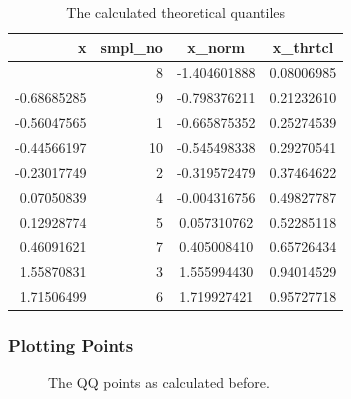 \documentclass[
  a4paper,
]{scrbook}
\begin{document}
\begin{longtable}{rrcc}

\caption{\label{tbl-qq-smpl-thrtcl}The calculated theoretical quantiles}

\tabularnewline

\toprule
x & smpl\_no & x\_norm & x\_thrtcl \\ 
\midrule\addlinespace[2.5pt]
-1.26506123 & 8 & -1.404601888 & 0.08006985 \\ 
-0.68685285 & 9 & -0.798376211 & 0.21232610 \\ 
-0.56047565 & 1 & -0.665875352 & 0.25274539 \\ 
-0.44566197 & 10 & -0.545498338 & 0.29270541 \\ 
-0.23017749 & 2 & -0.319572479 & 0.37464622 \\ 
0.07050839 & 4 & -0.004316756 & 0.49827787 \\ 
0.12928774 & 5 & 0.057310762 & 0.52285118 \\ 
0.46091621 & 7 & 0.405008410 & 0.65726434 \\ 
1.55870831 & 3 & 1.555994430 & 0.94014529 \\ 
1.71506499 & 6 & 1.719927421 & 0.95727718 \\ 
\bottomrule

\end{longtable}

\endgroup

\subsubsection{Plotting Points}\label{plotting-points}

\begin{figure}[H]


\caption{\label{fig-qq-pts}The QQ points as calculated before.}

\end{figure}%
\end{document}
